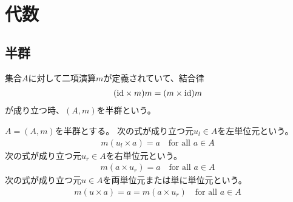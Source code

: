 \section{代数}

\subsection{半群}

\begin{definition}[半群]
集合$A$に対して二項演算$m$が定義されていて、結合律
\begin{equation}\begin{split}
	({\operatorname{id}}\times m)m = (m\times {\operatorname{id}})m
\end{split}\end{equation}
が成り立つ時、$(A,m)$を半群という。
\end{definition}

\begin{definition}[単位元]
$A=(A,m)$を半群とする。
次の式が成り立つ元$u_l\in A$を左単位元という。
\begin{equation*}\begin{split}
	m(u_l\times a) = a \quad\text{for all }a\in A
\end{split}\end{equation*}
次の式が成り立つ元$u_r\in A$を右単位元という。
\begin{equation*}\begin{split}
	m(a\times u_r) = a \quad\text{for all }a\in A
\end{split}\end{equation*}
次の式が成り立つ元$u\in A$を両単位元または単に単位元という。
\begin{equation*}\begin{split}
	m(u\times a) = a = m(a\times u_r) \quad\text{for all }a\in A
\end{split}\end{equation*}
\end{definition}


